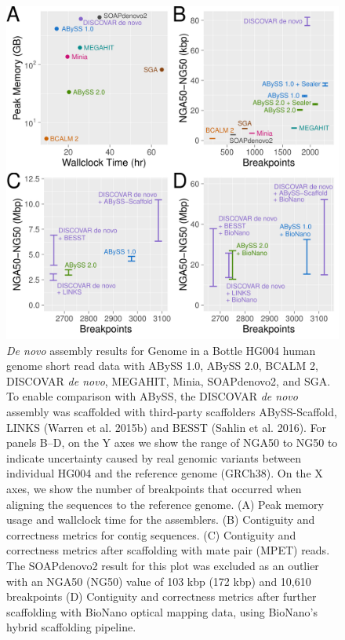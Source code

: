 \documentclass[
  12pt,
  oneside,
  openany]{book}
\begin{document}
\begin{figure}
\hypertarget{fig:metrics}{%
\centering
\includegraphics{abyss2/assembler-comparison.png}
\caption[\emph{De novo} assembly results for Genome in a Bottle HG004 human genome short read data with ABySS 1.0, ABySS 2.0, BCALM 2, DISCOVAR \emph{de novo}, MEGAHIT, Minia, SOAPdenovo2, and SGA.]{\emph{De novo} assembly results for Genome in a Bottle HG004 human genome short read data with ABySS 1.0, ABySS 2.0, BCALM 2, DISCOVAR \emph{de novo}, MEGAHIT, Minia, SOAPdenovo2, and SGA. To enable comparison with ABySS, the DISCOVAR \emph{de novo} assembly was scaffolded with third-party scaffolders ABySS-Scaffold, LINKS (Warren et al. 2015b) and BESST (Sahlin et al. 2016). For panels B--D, on the Y axes we show the range of NGA50 to NG50 to indicate uncertainty caused by real genomic variants between individual HG004 and the reference genome (GRCh38). On the X axes, we show the number of breakpoints that occurred when aligning the sequences to the reference genome. (A) Peak memory usage and wallclock time for the assemblers. (B) Contiguity and correctness metrics for contig sequences. (C) Contiguity and correctness metrics after scaffolding with mate pair (MPET) reads. The SOAPdenovo2 result for this plot was excluded as an outlier with an NGA50 (NG50) value of 103 kbp (172 kbp) and 10,610 breakpoints (D) Contiguity and correctness metrics after further scaffolding with BioNano optical mapping data, using BioNano's hybrid scaffolding pipeline.}\label{fig:metrics}
}
\end{figure}
\end{document}
